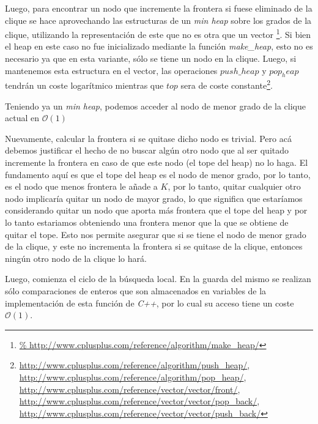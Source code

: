 \par Luego, para encontrar un nodo que incremente la frontera
    si fuese eliminado de la clique se hace aprovechando
    las estructuras de un \emph{min heap} sobre los grados
    de la clique, utilizando la representaci\'on de este
    que no es otra que un vector \footnote{\url{%
    http://www.cplusplus.com/reference/algorithm/make_heap/}}.
    Si bien el heap en este caso no fue inicializado mediante
    la funci\'on \emph{make\_heap}, esto no es necesario ya
    que en esta variante, s\'olo se tiene un nodo en la clique.
    Luego, si mantenemos esta estructura en el vector, las operaciones
    $push\_heap$ y $pop_heap$ tendr\'an un coste logar\'itmico
    mientras que $top$ sera de coste constante\footnote{%
    \url{http://www.cplusplus.com/reference/algorithm/push_heap/},%
    \url{http://www.cplusplus.com/reference/algorithm/pop_heap/},%
    \url{http://www.cplusplus.com/reference/vector/vector/front/},%
    \url{http://www.cplusplus.com/reference/vector/vector/pop_back/},%
    \url{http://www.cplusplus.com/reference/vector/vector/push_back/}}.

\par Teniendo ya un \emph{min heap}, podemos acceder al nodo
    de menor grado de la clique actual en $\mathcal O(1)$

\par Nuevamente, calcular la frontera si se quitase dicho
    nodo es trivial. Pero ac\'a debemos justificar el hecho
    de no buscar alg\'un otro nodo que al ser quitado incremente
    la frontera en caso de que este nodo (el tope del heap) no
    lo haga. El fundamento aqu\'i es que el tope del heap
    es el nodo de menor grado, por lo tanto, es el nodo
    que menos frontera le a\~nade a $K$, por lo tanto,
    quitar cualquier otro nodo implicar\'ia quitar un nodo
    de mayor grado, lo que significa que estar\'iamos
    considerando quitar un nodo que aporta m\'as frontera
    que el tope del heap y por lo tanto estariamos
    obteniendo una frontera menor que la que se obtiene
    de quitar el tope. Esto nos permite asegurar que si
    se tiene el nodo de menor grado de la clique, y este
    no incrementa la frontera si se quitase de la clique,
    entonces ning\'un otro nodo de la clique lo har\'a.

\par Luego, comienza el ciclo de la b\'usqueda local. En la
    guarda del mismo se realizan s\'olo comparaciones
    de enteros que son almacenados en variables de la implementaci\'on
    de esta funci\'on de \emph{C++}, por lo cual su acceso
    tiene un coste $\mathcal O(1)$.

